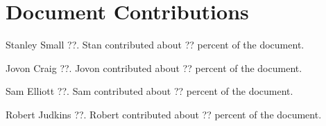 \documentclass{article}
\begin{document}
\newpage
\section{Document Contributions}

Stanley Small ??. Stan contributed about ?? percent of the document.

Jovon Craig ??. Jovon contributed about ?? percent of the document.

Sam Elliott ??. Sam contributed about ?? percent of the document.

Robert Judkins ??. Robert contributed about ?? percent of the document.

\newpage




\newpage



\end{document}
